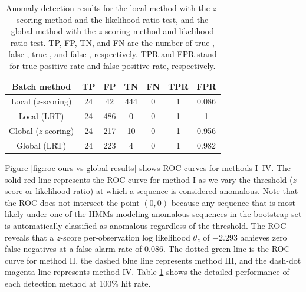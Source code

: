 \begin{table}[t]
  \caption[Anomaly detection results for the local method with the
    $z$-scoring method and the likelihood ratio test, and the global
    method with the $z$-scoring method and likelihood ratio
    test.]{\small Anomaly detection results for the local method with
    the $z$-scoring method and the likelihood ratio test, and the
    global method with the $z$-scoring method and likelihood ratio
    test. TP, FP, TN, and FN are the number of true \DIFdelbeginFL {}\DIFdelendFL \DIFaddbeginFL {}\DIFaddendFL , 
    false \DIFdelbeginFL {}\DIFdelendFL \DIFaddbeginFL {}\DIFaddendFL , true \DIFdelbeginFL {}\DIFdelendFL \DIFaddbeginFL {}\DIFaddendFL , and false \DIFdelbeginFL {}\DIFdelendFL \DIFaddbeginFL {}\DIFaddendFL , respectively. 
    TPR and FPR stand for true positive rate and false positive rate, 
    respectively.}
  \begin{center}
    \begin{tabular}{c|c|c|c|c|c|c}
      \hline Batch method & TP & FP & TN & FN & TPR & FPR \\ \hline \hline
      Local ($z$-scoring) & 24 & 42 & 444 & 0 & 1 & 0.086 \\ \hline
      Local (LRT) & 24 & 486 & 0 & 0 & 1 & 1 \\ \hline 
      Global ($z$-scoring) & 24 & 217 & 10 & 0 & 1 & 0.956 \\ \hline 
      Global (LRT) & 24 & 223 & 4 & 0 & 1 & 0.982 \\ \hline
    \end{tabular}
  \end{center}
  \label{tab:hmm-based-detection-results}
\end{table} 

Figure \ref{fig:roc-ours-vs-global-results} shows ROC curves for
methods I--IV.  The solid red line represents the ROC curve for method
I as we vary the threshold ($z$-score or likelihood ratio) at which a
sequence is considered anomalous. Note that the ROC does not intersect
the point $(0, 0)$ because any sequence that is most likely under one
of the HMMs modeling anomalous sequences in the bootstrap set is
automatically classified as anomalous regardless of the threshold. The
ROC reveals that a $z$-score per-observation log likelihood $\theta_z$
of $-2.293$ achieves zero false negatives at a false alarm rate of
0.086. The dotted green line is the ROC curve for method II, the
dashed blue line represents method III, and the dash-dot magenta line
represents method IV.  Table
\ref{tab:hmm-based-detection-results} shows the detailed performance
of each detection method at 100\% hit rate.

